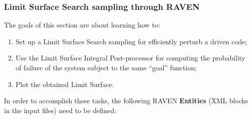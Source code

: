 \subsubsection{Limit Surface Search sampling through RAVEN}
\label{subsub:LSsamplingExample}
The goals of this section are about learning how to:
 \begin{enumerate}
   \item Set up a Limit Surface Search sampling for efficiently perturb a driven code;
   \item Use the Limit Surface Integral Post-processor for computing the probability of failure of the system subject to the same 
   ``goal'' function;
   \item Plot the obtained Limit Surface.
\end{enumerate}  
In order to accomplish these tasks, the following RAVEN \textbf{Entities} (XML blocks in the input files) need to be defined:
